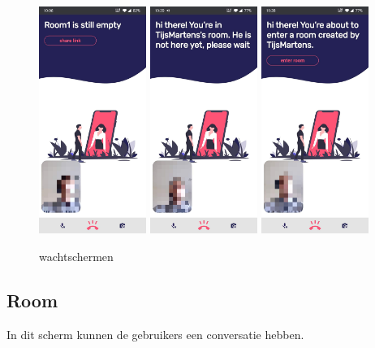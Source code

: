 		\begin{figure}[H]
			\centering
			\includegraphics[width=35mm]{./img/POC/waitAsOwner.jpg}{}		\includegraphics[width=35mm]{./img/POC/waitAsVisitor1.jpg}{}
			\includegraphics[width=35mm]{./img/POC/waitAsVisitor2.jpg}{}
			\caption{wachtschermen}
		\end{figure}
		
		
	\newpage
	\subsection{Room}
		In dit scherm kunnen de gebruikers een conversatie hebben. 
		
